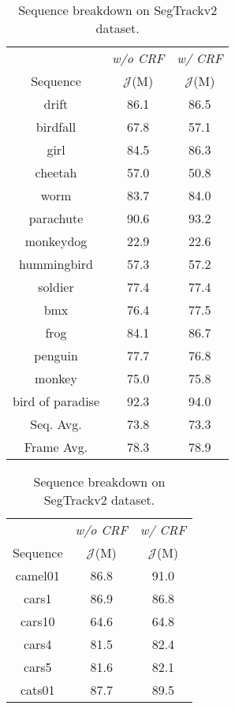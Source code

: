 \begin{table}[t]
\parbox{.48\linewidth}{
    
    \begin{center}
    \begin{tabular}{ccc}
        \toprule
         & \textit{w/o CRF}  & \textit{w/ CRF} \\
         Sequence & $\mathcal{J}$(M) & $\mathcal{J}$(M)  \\
         \midrule
drift            & 86.1 & 86.5 \\
birdfall         & 67.8 & 57.1 \\
girl             & 84.5 & 86.3 \\
cheetah          & 57.0 & 50.8 \\
worm             & 83.7 & 84.0 \\
parachute        & 90.6 & 93.2 \\
monkeydog        & 22.9 & 22.6 \\
hummingbird      & 57.3 & 57.2 \\
soldier          & 77.4 & 77.4 \\
bmx              & 76.4 & 77.5 \\
frog             & 84.1 & 86.7 \\
penguin          & 77.7 & 76.8 \\
monkey           & 75.0 & 75.8 \\
bird of paradise & 92.3 & 94.0 \\
\midrule
Seq. Avg.          & 73.8 & 73.3 \\
Frame Avg.         & 78.3 & 78.9 \\
            \bottomrule
    \end{tabular}
    \end{center}
    \caption{Sequence breakdown on SegTrackv2 dataset. }
    \label{tab:supp_seq_stv2}
}
\hfill
\parbox{.48\linewidth}{
    \begin{center}
    \begin{tabular}{ccc}
        \toprule
         & \textit{w/o CRF}  & \textit{w/ CRF} \\
         Sequence & $\mathcal{J}$(M) & $\mathcal{J}$(M)  \\
         \midrule
camel01 & 86.8 & 91.0 \\
cars1 & 86.9 & 86.8 \\
cars10 & 64.6 & 64.8 \\
cars4 & 81.5 & 82.4 \\
cars5 & 81.6 & 82.1 \\
cats01 & 87.7 & 89.5 \\

\end{tabular}
\end{center}}
\end{table}
